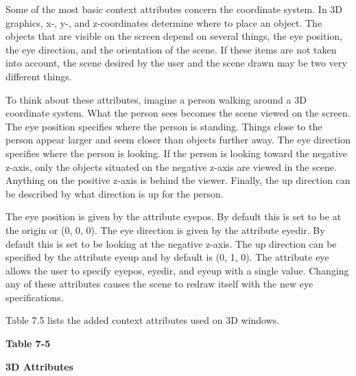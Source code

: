 Some of the most basic context attributes concern the coordinate
system.  In 3D graphics, x-, y-, and z-coordinates determine where to
place an object. The objects that are visible on the screen depend on
several things, the eye position, the eye direction, and the
orientation of the scene. If these items are not taken into account,
the scene desired by the user and the scene drawn may be two very
different things.

To think about these attributes, imagine a person walking around a 3D
coordinate system. What the person sees becomes the scene viewed on
the screen. The eye position specifies where the person is
standing. Things close to the person appear larger and seem closer
than objects further away. The eye direction specifies where the
person is looking. If the person is looking toward the negative
z-axis, only the objects situated on the negative z-axis are viewed in
the scene. Anything on the positive z-axis is behind the
viewer. Finally, the up direction can be described by what direction
is up for the person.

The eye position is given by the attribute eyepos. By default this is
set to be at the origin or (0, 0, 0). The eye direction is given by
the attribute eyedir. By default this is set to be looking at the
negative z-axis. The up direction can be specified by the attribute
eyeup and by default is (0, 1, 0). The attribute eye allows the user
to specify eyepos, eyedir, and eyeup with a single value. Changing any
of these attributes causes the scene to redraw itself with the new eye
specifications.

Table 7.5 lists the added context attributes used on 3D windows.

{\centering\sffamily\bfseries
Table 7-5
\par}

{\centering\sffamily\bfseries
3D Attributes
\par}

